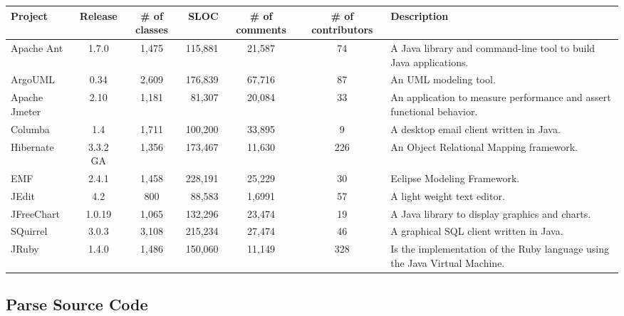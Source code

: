 \begin{table}[!tbh]
    \begin{center}
    \label{tab:project_details}
            \begin{tabular}{l| c c r c c | p{2.0in}}
            \toprule
            \textbf{Project}   & \textbf{Release}  & \textbf{\# of classes}   & \textbf{SLOC}    & \textbf{\# of comments}  & \textbf{\# of contributors} & \textbf{Description}\\ \midrule 
            Apache Ant     & 1.7.0    & 1,475 & 115,881 & 21,587 & 74  & A Java library and command-line tool to build Java applications.\\
            ArgoUML        & 0.34     & 2,609 & 176,839 & 67,716 & 87  & An UML modeling tool.\\
            Apache Jmeter  & 2.10     & 1,181 &  81,307 & 20,084 & 33  & An application to measure performance and assert functional behavior.\\
            Columba        & 1.4      & 1,711 & 100,200 & 33,895 & 9   & A desktop email client written in Java.\\
            Hibernate      & 3.3.2 GA & 1,356 & 173,467 & 11,630 & 226 & An Object Relational Mapping framework.\\
            EMF            & 2.4.1    & 1,458 & 228,191 & 25,229 & 30  & Eclipse Modeling Framework.\\
            JEdit          & 4.2      &   800 &  88,583 & 1,6991 & 57  & A light weight text editor.\\
            JFreeChart     & 1.0.19   & 1,065 & 132,296 & 23,474 & 19  & A Java library to display graphics and charts.\\
            SQuirrel       & 3.0.3    & 3,108 & 215,234 & 27,474 & 46  & A graphical SQL client written in Java.\\ 
            JRuby          & 1.4.0    & 1,486 & 150,060 & 11,149 & 328 & Is the implementation of the Ruby language using the Java Virtual Machine.\\ \bottomrule
            
        \end{tabular}
    \end{center}
\end{table}


\subsection{Parse Source Code} %
\label{sub:parse_source_code}

